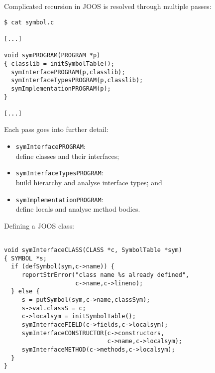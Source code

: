 \begin{slide*}
Complicated recursion in JOOS is resolved through multiple passes:

\begin{scriptsize}
\begin{verbatim}
$ cat symbol.c

[...]

void symPROGRAM(PROGRAM *p)
{ classlib = initSymbolTable();
  symInterfacePROGRAM(p,classlib);
  symInterfaceTypesPROGRAM(p,classlib);
  symImplementationPROGRAM(p);
}

[...]
\end{verbatim}
\end{scriptsize}

Each pass goes into further detail:

\begin{itemize}
\item {\small\tt symInterfacePROGRAM}:\\
      define classes and their interfaces;
\item {\small\tt symInterfaceTypesPROGRAM}:\\
      build hierarchy and analyse interface types; and
\item {\small\tt symImplementationPROGRAM}:\\
      define locals and analyse method bodies.
\end{itemize}
\vfil
\end{slide*}
 
\begin{slide*}
Defining a JOOS class:

\begin{scriptsize}
\begin{verbatim}

void symInterfaceCLASS(CLASS *c, SymbolTable *sym)
{ SYMBOL *s;
  if (defSymbol(sym,c->name)) {
     reportStrError("class name %s already defined",
                    c->name,c->lineno);
  } else {
     s = putSymbol(sym,c->name,classSym);
     s->val.classS = c;
     c->localsym = initSymbolTable();
     symInterfaceFIELD(c->fields,c->localsym);
     symInterfaceCONSTRUCTOR(c->constructors,
                             c->name,c->localsym);
     symInterfaceMETHOD(c->methods,c->localsym);
  }
}
\end{verbatim}
\end{scriptsize}
\vfil
\end{slide*}
 
